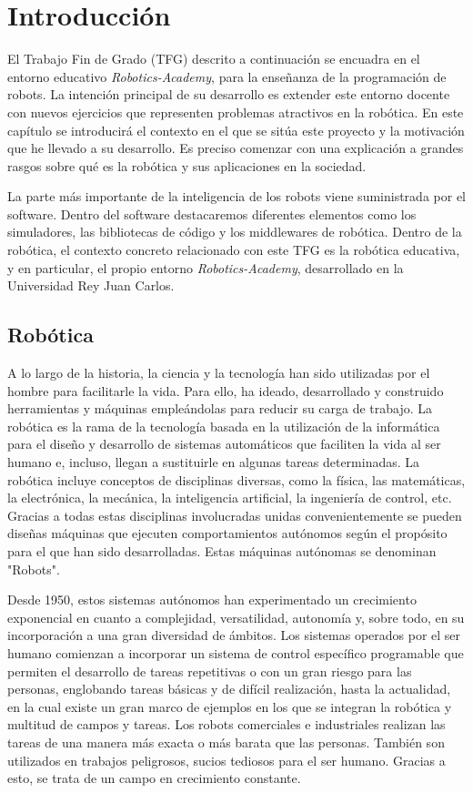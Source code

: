 \chapter{Introducción}\label{cap.introduccion}
El Trabajo Fin de Grado (TFG) descrito a continuación se encuadra en el entorno educativo \textit{Robotics-Academy}, para la enseñanza de la programación de robots. La intención principal de su desarrollo es extender este entorno docente con nuevos ejercicios que representen problemas atractivos en la robótica. En este capítulo se introducirá el contexto en el que se sitúa este proyecto y la motivación que he llevado a su desarrollo. Es preciso comenzar con una explicación a grandes rasgos sobre qué es la robótica y sus aplicaciones en la sociedad.

La parte más importante de la inteligencia de los robots viene suministrada por el software. Dentro del software destacaremos diferentes elementos como los simuladores, las bibliotecas de código y los middlewares de robótica. Dentro de la robótica, el contexto concreto relacionado con este TFG es la robótica educativa, y en particular, el propio entorno \textit{Robotics-Academy}, desarrollado en la Universidad Rey Juan Carlos.

\section{Robótica}
A lo largo de la historia, la ciencia y la tecnología han sido utilizadas por el hombre para facilitarle la vida. Para ello, ha ideado, desarrollado y construido herramientas y máquinas empleándolas para reducir su carga de trabajo. La robótica es la rama de la tecnología basada en la utilización de la informática para el diseño y desarrollo de sistemas automáticos que faciliten la vida al ser humano e, incluso, llegan a sustituirle en algunas tareas determinadas. La robótica incluye conceptos de disciplinas diversas, como la física, las matemáticas, la electrónica, la mecánica, la inteligencia artificial, la ingeniería de control, etc. Gracias a todas estas disciplinas involucradas unidas convenientemente se pueden diseñas máquinas que ejecuten comportamientos autónomos según el propósito para el que han sido desarrolladas. Estas máquinas autónomas se denominan "Robots".

Desde 1950, estos sistemas autónomos han experimentado un crecimiento exponencial en cuanto a complejidad, versatilidad, autonomía y, sobre todo, en su incorporación a una gran diversidad de ámbitos. Los sistemas operados por el ser humano comienzan a incorporar un sistema de control específico programable que permiten el desarrollo de tareas repetitivas o con un gran riesgo para las personas, englobando tareas básicas y de difícil realización, hasta la actualidad, en la cual existe un gran marco de ejemplos en los que se integran la robótica y multitud de campos y tareas. Los robots comerciales e industriales realizan las tareas de una manera más exacta o más barata que las personas. También son utilizados en trabajos peligrosos, sucios tediosos para el ser humano. Gracias a esto, se trata de un campo en crecimiento constante.

